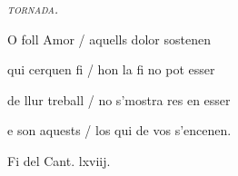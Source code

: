 \documentclass[12pt]{article}
\begin{document}
\begin{estrofaExtra}%




\begin{tornada}

\textit{\textsc{tornada.}}

\end{tornada}


\end{estrofaExtra}


\begin{estrofa}

 O foll Amor / aquells dolor sostenen

 qui cerquen fi / hon la fi no pot esser

 de llur treball / no s'mostra res en esser

 e son aquests / los qui de vos s'encenen.

\end{estrofa}



\begin{estrofaExtra}%

\begin{final}

Fi del Cant. lxviij.

\end{final}

\end{estrofaExtra}
\end{document}
